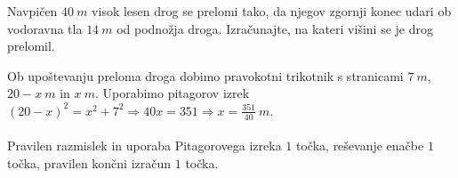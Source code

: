 \documentclass[addpoints]{exam}
\begin{document}
\begin{questions}


    \question[3]
    Navpičen $40~m$ visok lesen drog se prelomi tako, 
    da njegov zgornji konec udari ob vodoravna tla $14~m$ od podnožja droga.
    Izračunajte, na kateri višini se je drog prelomil.

    \begin{solution}[1cm]
        Ob upoštevanju preloma droga dobimo pravokotni trikotnik s stranicami $7~m$, $20-x~m$ in $x~m$.
        Uporabimo pitagorov izrek $(20-x)^2=x^2+7^2 \Rightarrow 40x=351 \Rightarrow x=\frac{351}{40}~m$. \\ \\
        Pravilen razmislek in uporaba Pitagorovega izreka $1$ točka, reševanje enačbe $1$ točka, pravilen končni izračun $1$ točka.
    \end{solution}


\end{questions}
\end{document}
